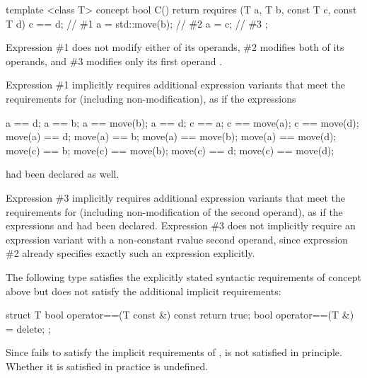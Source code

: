 \begin{addedblock}

\enterexample
\begin{codeblock}
template <class T>
concept bool C() {
  return requires (T a, T b, const T c, const T d) {
    c == d;       // \#1
    a = std::move(b);  // \#2
    a = c;        // \#3
  };
}
\end{codeblock}

Expression \#1 does not modify either of its operands, \#2 modifies both of its
operands, and \#3 modifies only its first operand .

Expression \#1 implicitly requires additional expression variants that meet the
requirements for  (including non-modification), as if the expressions
\begin{codeblock}
a == d;       a == b;             a == move(b);       a == d;
c == a;       c == move(a);       c == move(d);
move(a) == d; move(a) == b;       move(a) == move(b); move(a) == move(d);
move(c) == b; move(c) == move(b); move(c) == d;       move(c) == move(d);
\end{codeblock}
had been declared as well.

Expression \#3 implicitly requires additional expression variants that meet the
requirements for  (including non-modification of the second operand),
as if the expressions  and  had been declared.
Expression \#3 does not implicitly require an expression variant with a
non-constant rvalue second operand, since expression \#2 already specifies exactly
such an expression explicitly.
\exitexample

{\color{newclr}
\enterexample
The following type  satisfies the explicitly stated syntactic requirements
of concept  above but does not satisfy the additional implicit requirements:

\begin{codeblock}
struct T {
  bool operator==(T const &) const { return true; }
  bool operator==(T &) = delete;
};
\end{codeblock}

Since  fails to satisfy the implicit requirements of ,  is not
satisfied in principle. Whether it is satisfied in practice is undefined.
\exitexample
}


\end{addedblock}

